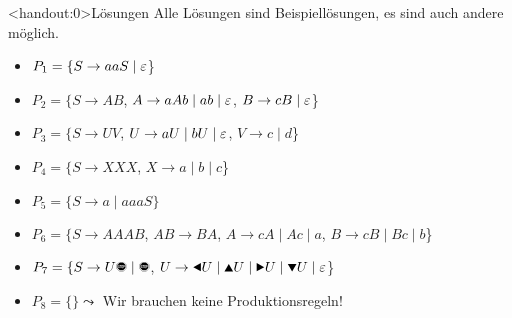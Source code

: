 {
\begin{frame}<handout:0>{Lösungen}
Alle Lösungen sind Beispiellösungen, es sind auch andere möglich.
    \begin{itemize}
        \item<1-> \alert<1>{$P_1 = \{S\rightarrow aaS\;|\;\varepsilon$\}}
        \item<2-> \alert<2>{$P_2 = \{S\rightarrow AB$, $A\rightarrow aAb \;|\; ab\; |\;\varepsilon$, $B\rightarrow cB \;|\; \varepsilon$\}}
        \item<3-> \alert<3>{$P_3 = \{S\rightarrow UV$, $U\rightarrow aU \;|\; bU \; |\; \varepsilon$, $V\rightarrow c \;|\; d$\}}
        \item<4-> \alert<4>{$P_4 = \{S\rightarrow XXX$, $X\rightarrow a \;|\; b \;|\; c$\}}
        \item<5-> \alert<5>{$P_5 = \{S\rightarrow a \;|\; aaaS\}$}
        \item<6-> \alert<6>{$P_6 = \{S\rightarrow AAAB$, $AB\rightarrow BA$, 
        $A\rightarrow cA \;|\; Ac \;|\; a$, 
        $B\rightarrow cB \;|\; Bc \;|\; b$\}}
        \item<7-> \alert<7>{$P_7 = \{S\rightarrow U\text{\Stopsign} \;|\; \text{\Stopsign}$, $U\rightarrow \text{\Rewind} U \;|\; \text{\MoveUp} U \;|\; \text{\Forward} U \;|\; \text{\MoveDown} U \;|\;\emptyWord$\}}
        \item<8-> \alert<8>{$P_8 = \{\} \leadsto$ Wir brauchen keine Produktionsregeln!}
    \end{itemize}
\end{frame}
}  
